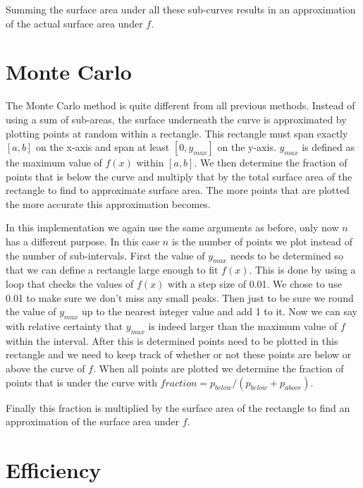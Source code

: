 \documentclass[a4paper,12px]{article}
\begin{document}
Summing the surface area under all these sub-curves results in an approximation
of the actual surface area under $f$.

\section{Monte Carlo}

The Monte Carlo method is quite different from all previous methods. Instead of
using a sum of sub-areas, the surface underneath the curve is approximated by
plotting points at random within a rectangle. This rectangle must span exactly
$[a,b]$ on the x-axis and span at least $[0,y_{max}]$ on the y-axis. $y_{max}$
is defined as the maximum value of $f(x)$ within $[a,b]$. We then determine the
fraction of points that is below the curve and multiply that by the total
surface area of the rectangle to find to approximate surface area. The more
points that are plotted the more accurate this approximation becomes.

In this implementation we again use the same arguments as before, only now $n$
has a different purpose. In this case $n$ is the number of points we plot
instead of the number of sub-intervals. First the value of $y_{max}$ needs to be
determined so that we can define a rectangle large enough to fit $f(x)$. This is
done by using a loop that checks the values of $f(x)$ with a step size of 0.01.
We chose to use 0.01 to make sure we don't miss any small peaks. Then just to be
sure we round the value of $y_{max}$ up to the nearest integer value and add 1
to it.  Now we can say with relative certainty that $y_{max}$ is indeed larger
than the maximum value of $f$ within the interval. After this is determined
points need to be plotted in this rectangle and we need to keep track of whether
or not these points are below or above the curve of $f$. When all points are
plotted we determine the fraction of points that is under the curve with
$fraction = p_{below}/(p_{below}+p_{above})$.

Finally this fraction is multiplied by the surface area of the rectangle to find
an approximation of the surface area under $f$.


\section{Efficiency}


%
%
\end{document}

